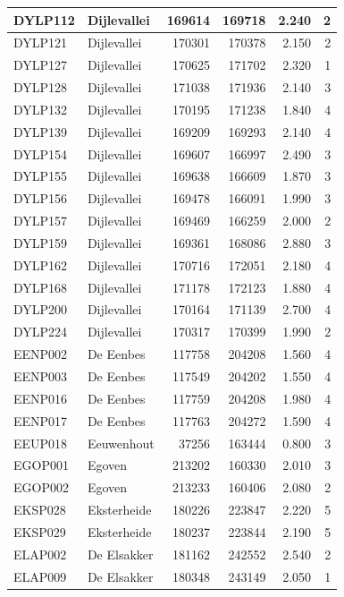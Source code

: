 \documentclass[11pt,]{book}
\begin{document}
\begin{table}
\begin{tabular}[t]{l|l|r|r|r|r}
\hline
DYLP112 & Dijlevallei & 169614 & 169718 & 2.240 & 2\\
\hline
DYLP121 & Dijlevallei & 170301 & 170378 & 2.150 & 2\\
\hline
DYLP127 & Dijlevallei & 170625 & 171702 & 2.320 & 1\\
\hline
DYLP128 & Dijlevallei & 171038 & 171936 & 2.140 & 3\\
\hline
DYLP132 & Dijlevallei & 170195 & 171238 & 1.840 & 4\\
\hline
DYLP139 & Dijlevallei & 169209 & 169293 & 2.140 & 4\\
\hline
DYLP154 & Dijlevallei & 169607 & 166997 & 2.490 & 3\\
\hline
DYLP155 & Dijlevallei & 169638 & 166609 & 1.870 & 3\\
\hline
DYLP156 & Dijlevallei & 169478 & 166091 & 1.990 & 3\\
\hline
DYLP157 & Dijlevallei & 169469 & 166259 & 2.000 & 2\\
\hline
DYLP159 & Dijlevallei & 169361 & 168086 & 2.880 & 3\\
\hline
DYLP162 & Dijlevallei & 170716 & 172051 & 2.180 & 4\\
\hline
DYLP168 & Dijlevallei & 171178 & 172123 & 1.880 & 4\\
\hline
DYLP200 & Dijlevallei & 170164 & 171139 & 2.700 & 4\\
\hline
DYLP224 & Dijlevallei & 170317 & 170399 & 1.990 & 2\\
\hline
EENP002 & De Eenbes & 117758 & 204208 & 1.560 & 4\\
\hline
EENP003 & De Eenbes & 117549 & 204202 & 1.550 & 4\\
\hline
EENP016 & De Eenbes & 117759 & 204208 & 1.980 & 4\\
\hline
EENP017 & De Eenbes & 117763 & 204272 & 1.590 & 4\\
\hline
EEUP018 & Eeuwenhout & 37256 & 163444 & 0.800 & 3\\
\hline
EGOP001 & Egoven & 213202 & 160330 & 2.010 & 3\\
\hline
EGOP002 & Egoven & 213233 & 160406 & 2.080 & 2\\
\hline
EKSP028 & Eksterheide & 180226 & 223847 & 2.220 & 5\\
\hline
EKSP029 & Eksterheide & 180237 & 223844 & 2.190 & 5\\
\hline
ELAP002 & De Elsakker & 181162 & 242552 & 2.540 & 2\\
\hline
ELAP009 & De Elsakker & 180348 & 243149 & 2.050 & 1\\

\end{tabular}
\end{table}
\end{document}
